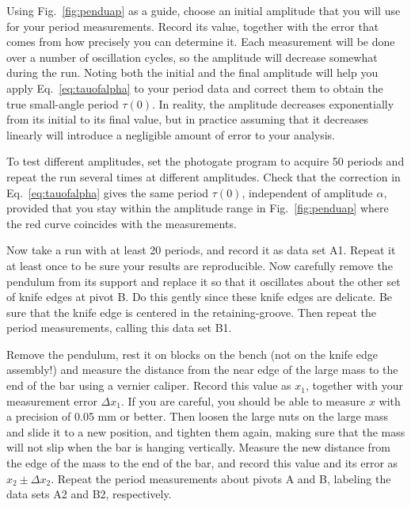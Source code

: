 \documentclass{revtex4}
\begin{document}
Using Fig.~\ref{fig:penduap} as a guide, choose an initial amplitude that
you will use for your period measurements.  Record its value, together
with the error that comes from how precisely you can determine it.  Each
measurement will be done over a number of oscillation cycles, so the
amplitude will decrease somewhat during the run.  Noting both
the initial and the final amplitude will help you apply
Eq.~\ref{eq:tauofalpha} to your period data and correct them to obtain
the true small-angle period $\tau(0)$.  In reality, the amplitude decreases
exponentially from its initial to its final value, but in practice assuming
that it decreases linearly will introduce a negligible amount of error to
your analysis.

To test different amplitudes, set the photogate program to acquire 50
periods and repeat the run several times at different amplitudes. 
Check that the correction in Eq.~\ref{eq:tauofalpha} gives the same
period $\tau(0)$, independent of amplitude $\alpha$, provided that you
stay within the amplitude range in Fig.~\ref{fig:penduap} where the
red curve coincides with the measurements.

Now take a run with at least 20 periods, and record it as data set A1.
Repeat it at least once to be sure your results are reproducible.  Now
carefully remove the pendulum from its support and replace it so that
it oscillates about the other set of knife edges at pivot B. Do this
gently since these knife edges are delicate. Be sure that the knife edge
is centered in the retaining-groove. Then repeat the period measurements,
calling this data set B1.

Remove the pendulum, rest it on blocks on the bench (not on the
knife edge assembly!) and measure the distance from the near edge of the
large mass to the end of the bar using a vernier caliper.  Record this
value as $x_1$, together with your measurement error $\Delta x_1$.
If you are careful, you should be able to measure $x$ with a precision
of 0.05 mm or better.  Then loosen the large nuts on the large mass and
slide it to a new position, and tighten them again, making sure that the
mass will not slip when the bar is hanging vertically.  Measure the new
distance from the edge of the mass to the end of the bar, and record this
value and its error as $x_2 \pm \Delta x_2$.  Repeat the period
measurements about pivots A and B, labeling the data sets A2 and B2,
respectively.
\end{document}
